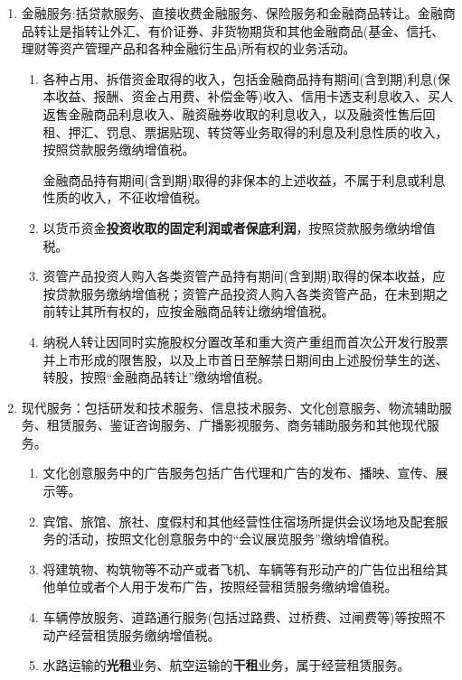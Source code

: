 \documentclass[UTF8,12pt]{ctexart}
\numberwithin{equation}{section} %
\numberwithin{figure}{section}
\numberwithin{table}{section}
\begin{document}
\begin{enumerate}
		\item 金融服务:括贷款服务、直接收费金融服务、保险服务和金融商品转让。金融商品转让是指转让外汇、有价证券、非货物期货和其他金融商品(基金、信托、理财等资产管理产品和各种金融衍生品)所有权的业务活动。
		\begin{enumerate}
			\item 各种占用、拆借资金取得的收入，包括金融商品持有期间(含到期)利息(保本收益、报酬、资金占用费、补偿金等)收入、信用卡透支利息收入、买人返售金融商品利息收入、融资融券收取的利息收入，以及融资性售后回租、押汇、罚息、票据贴现、转贷等业务取得的利息及利息性质的收入，按照贷款服务缴纳增值税。
			
			金融商品持有期间(含到期)取得的非保本的上述收益，不属于利息或利息性质的收入，不征收增值税。
			
			\item 以货币资金\textbf{投资收取的固定利润或者保底利润}，按照贷款服务缴纳增值税。
			
			\item 资管产品投资人购入各类资管产品持有期间(含到期)取得的保本收益，应按贷款服务缴纳增值税；资管产品投资人购入各类资管产品，在未到期之前转让其所有权的，应按金融商品转让缴纳增值税。
			
			\item 纳税人转让因同时实施股权分置改革和重大资产重组而首次公开发行股票并上市形成的限售股，以及上市首日至解禁日期间由上述股份孳生的送、转股，按照“金融商品转让”缴纳增值税。
		\end{enumerate}
		
		\item 现代服务：包括研发和技术服务、信息技术服务、文化创意服务、物流辅助服务、租赁服务、鉴证咨询服务、广播影视服务、商务辅助服务和其他现代服务。
		\begin{enumerate}
			\item 文化创意服务中的广告服务包括广告代理和广告的发布、播映、宣传、展示等。
			
			\item 宾馆、旅馆、旅社、度假村和其他经营性住宿场所提供会议场地及配套服务的活动，按照文化创意服务中的“会议展览服务”缴纳增值税。
			
			\item 将建筑物、构筑物等不动产或者飞机、车辆等有形动产的广告位出租给其他单位或者个人用于发布广告，按照经营租赁服务缴纳增值税。
			
			\item 车辆停放服务、道路通行服务(包括过路费、过桥费、过闸费等)等按照不动产经营租赁服务缴纳增值税。
			
			\item 水路运输的\textbf{光租}业务、航空运输的\textbf{干租}业务，属于经营租赁服务。
			

\end{enumerate}
\end{enumerate}
\end{document}
